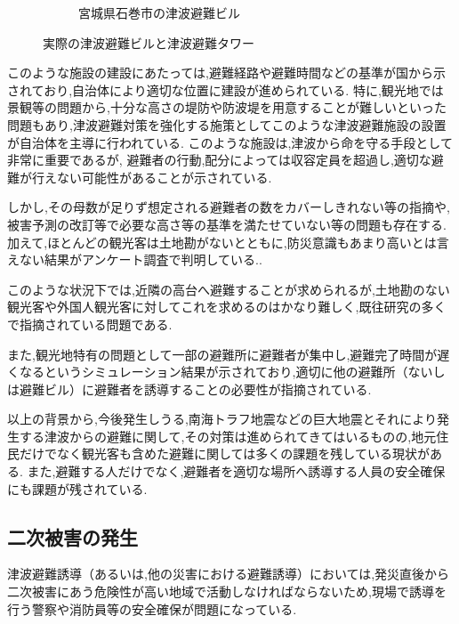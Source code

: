 \begin{figure}[H]
\begin{subfigure}{0.5\textwidth}
      \caption{宮城県石巻市の津波避難ビル}
      \label{fig:image2}
  \end{subfigure}
  \caption{実際の津波避難ビルと津波避難タワー}
  \label{fig:side_by_side}
\end{figure}
このような施設の建設にあたっては,避難経路や避難時間などの基準が国から示されており,自治体により適切な位置に建設が進められている.
特に,観光地では景観等の問題から,十分な高さの堤防や防波堤を用意することが難しいといった問題もあり,津波避難対策を強化する施策としてこのような津波避難施設の設置が自治体を主導に行われている.
このような施設は,津波から命を守る手段として非常に重要であるが,
避難者の行動,配分によっては収容定員を超過し,適切な避難が行えない可能性があることが示されている\cite{shimauchi2017}.\par 

しかし,その母数が足りず想定される避難者の数をカバーしきれない等の指摘や,被害予測の改訂等で必要な高さ等の基準を満たせていない等の問題も存在する\cite{yamada2018}.
加えて,ほとんどの観光客は土地勘がないとともに,防災意識もあまり高いとは言えない結果がアンケート調査で判明している.\cite{Okayasu2007}.

このような状況下では,近隣の高台へ避難することが求められるが,土地勘のない観光客や外国人観光客に対してこれを求めるのはかなり難しく,既往研究の多くで指摘されている問題である.\par 

また,観光地特有の問題として一部の避難所に避難者が集中し,避難完了時間が遅くなるというシミュレーション結果が示されており,適切に他の避難所（ないしは避難ビル）に避難者を誘導することの必要性が指摘されている\cite{kitahara2013tsunami}.


\vspace{\baselineskip}
以上の背景から,今後発生しうる,南海トラフ地震などの巨大地震とそれにより発生する津波からの避難に関して,その対策は進められてきてはいるものの,地元住民だけでなく観光客も含めた避難に関しては多くの課題を残している現状がある.
また,避難する人だけでなく,避難者を適切な場所へ誘導する人員の安全確保にも課題が残されている.


\subsection{二次被害の発生}
津波避難誘導（あるいは,他の災害における避難誘導）においては,発災直後から二次被害にあう危険性が高い地域で活動しなければならないため,現場で誘導を行う警察や消防員等の安全確保が問題になっている.\par

